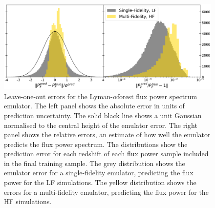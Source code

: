 \documentclass[a4paper,11pt]{article}
\newcommand{\spb}[1]{{\textcolor{magenta}{[{\bf SPB}: #1]}}}
\newcommand{\Lya}{Lyman-$\alpha$}
\begin{document}
\begin{figure}
    \centering
    \includegraphics[width=\textwidth]{figures/fpsemu_errors.pdf}
    \caption{\label{fig:fps_error}
    Leave-one-out errors for the \Lya forest flux power spectrum emulator.
    The left panel shows the absolute error in units of prediction uncertainty. The solid black line shows a unit Gaussian normalised to the central height of the emulator error.
    The right panel shows the relative errors, an estimate of how well the emulator predicts the flux power spectrum.
    The distributions show the prediction error for each redshift of each flux power sample included in the final training sample.
    The grey distribution shows the emulator error for a single-fidelity emulator, predicting the flux power for the LF simulations.
    The yellow distribution shows the errors for a multi-fidelity emulator, predicting the flux power for the HF simulations.
    }
\end{figure}


\end{document}

